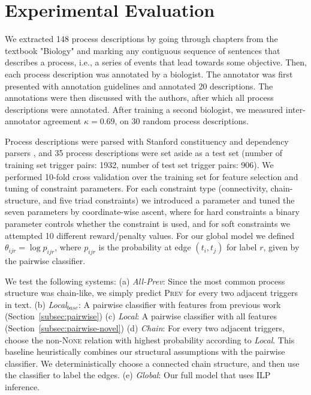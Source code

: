 \section{Experimental Evaluation} \label{subsec:setup}

We extracted 148 process descriptions by going through chapters from the textbook "Biology" and marking any contiguous sequence of sentences that describes a process, i.e., a series of events that lead towards some objective. Then, each process description was annotated by a biologist. The annotator was first presented with annotation guidelines and annotated 20 descriptions. The annotations were then discussed with the authors, after which all process descriptions were annotated. After training a second biologist, we measured inter-annotator agreement $\kappa=0.69$, on 30 random process descriptions. 

Process descriptions were parsed with Stanford constituency and dependency parsers \cite{Klein03,Marneffe06}, and 35 process descriptions were set aside as a test set (number of training set trigger pairs: 1932, number of test set trigger pairs: 906). We performed 10-fold cross validation over the training set for feature selection and tuning of constraint parameters. For each constraint type (connectivity, chain-structure, and five triad constraints) we introduced a parameter and tuned the seven parameters by coordinate-wise ascent, where for hard constraints a binary parameter controls whether the constraint is used, and for soft constraints we attempted 10 different reward/penalty values. For our global model we defined $\theta_{ijr}=\log p_{ijr}$, where $p_{ijr}$ is the probability at edge $(t_i,t_j)$ for label $r$, given by the pairwise classifier.


We test the following systems: (a) \emph{All-Prev}: Since the most common process structure was chain-like, we simply predict \textsc{Prev} for every two adjacent triggers in text. (b) \emph{Local$_{base}$}: A pairwise classifier with features from previous work (Section~\ref{subsec:pairwise}) (c) \emph{Local}: A pairwise classifier with all features (Section~\ref{subsec:pairwise-novel}) (d) \emph{Chain}: For every two adjacent triggers, choose the non-\textsc{None} relation with highest probability according to \emph{Local}. This baseline heuristically combines our structural assumptions with the pairwise classifier. We deterministically choose a connected chain structure, and then use the classifier to label the edges.  (e) \emph{Global}: Our full model that uses ILP inference.

